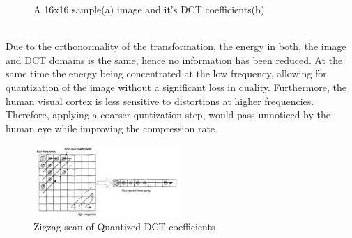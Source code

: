 \documentclass[a4paper,11pt,oneside]{article}
\begin{document}
\begin{figure}[h]
    \centering
    \qquad
    \caption{A 16x16 sample(a) image and it's DCT coefficients(b) \cite[pp.~35]{richardson2002video}}
    \label{figure:DCTexample}
\end{figure}\\
\indent Due to the orthonormality of the transformation, the energy in both, the image and DCT domains is the same, hence no information has been reduced. At the same time the energy being concentrated at the low frequency, allowing for quantization of the image without a significant loss in quality. Furthermore, the human visual cortex is less sensitive to distortions at higher frequencies. Therefore, applying a coarser quntization step, would pass unnoticed by the human eye while improving the compression rate. \\
\begin{figure}
    \includegraphics[width=0.5\textwidth]{../figures/zigzag_reorder_QDCT.pdf}
    \caption{Zigzag scan of Quantized DCT coefficients \cite[pp.40]{richardson2002video}}
    \label{figure:zigzag_scan}
\end{figure}
\end{document}
